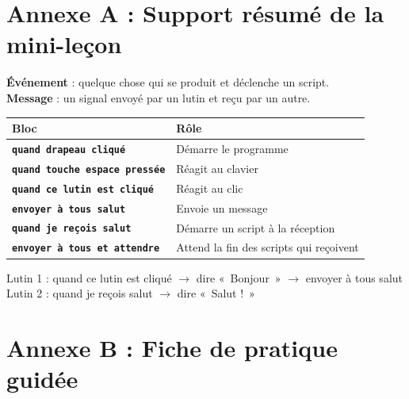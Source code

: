 \documentclass[11pt,a4paper]{article}
\begin{document}

\newpage
\section*{Annexe A : Support résumé de la mini-leçon}

\begin{tcolorbox}[colback=yellow!10,colframe=yellow!50!black]
\textbf{Événement} : quelque chose qui se produit et déclenche un script.\\
\textbf{Message} : un signal envoyé par un lutin et reçu par un autre.
\end{tcolorbox}

\begin{tabularx}{\linewidth}{>{\bfseries}p{4.6cm}Y}
\toprule
Bloc & Rôle\\
\midrule
\texttt{quand drapeau cliqué} & Démarre le programme\\
\texttt{quand touche espace pressée} & Réagit au clavier\\
\texttt{quand ce lutin est cliqué} & Réagit au clic\\
\texttt{envoyer à tous salut} & Envoie un message\\
\texttt{quand je reçois salut} & Démarre un script à la réception\\
\texttt{envoyer à tous et attendre} & Attend la fin des scripts qui reçoivent\\
\bottomrule
\end{tabularx}

\begin{code}[Modèle]
Lutin 1 : quand ce lutin est cliqué $\rightarrow$ dire «~Bonjour~» $\rightarrow$ envoyer à tous salut\\
Lutin 2 : quand je reçois salut $\rightarrow$ dire «~Salut !~»
\end{code}

\newpage
\section*{Annexe B : Fiche de pratique guidée}
\end{document}
